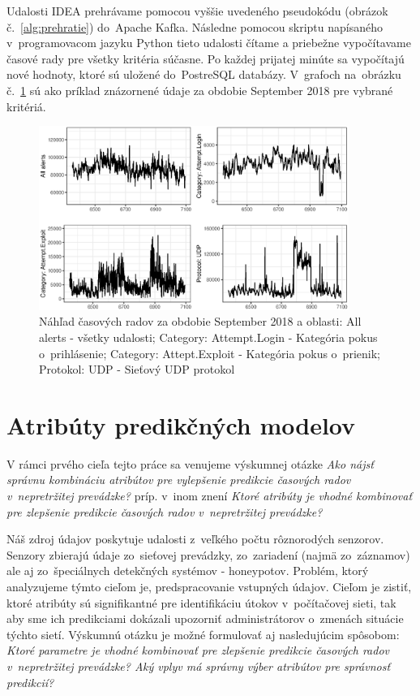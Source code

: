 \documentclass[thesismargins, thesislinespacing, openright, upjsfrontpage]{rnthesis}
\begin{document}
Udalosti IDEA prehrávame pomocou vyššie uvedeného pseudokódu (obrázok č.~\ref{alg:prehratie}) do~Apache Kafka. Následne pomocou skriptu napísaného v~programovacom jazyku Python tieto udalosti čítame a priebežne vypočítavame časové rady pre všetky kritéria súčasne. Po každej prijatej minúte sa vypočítajú nové hodnoty, ktoré sú uložené do~PostreSQL databázy. V~grafoch na~obrázku č.~\ref{fig:timeseries_example} sú ako príklad znázornené údaje za obdobie September 2018 pre vybrané kritériá.

\begin{figure}[h]
  \centering
  \includegraphics[width=0.9\textwidth]{images/TestFig3.eps}
  \caption{Náhľad časových radov za obdobie September 2018 a oblasti: All alerts - všetky udalosti; Category: Attempt.Login - Kategória pokus o~prihlásenie; Category: Attept.Exploit - Kategória pokus o~prienik; Protokol: UDP - Sieťový UDP protokol}
  \label{fig:timeseries_example}
\end{figure}

\section{Atribúty predikčných modelov}
V rámci prvého cieľa tejto práce sa venujeme výskumnej otázke \textit{Ako nájsť správnu kombináciu atribútov pre vylepšenie predikcie časových radov v~nepretržitej prevádzke?} príp. v~inom znení \textit{Ktoré atribúty je vhodné kombinovať pre zlepšenie predikcie časových radov v~nepretržitej prevádzke?}

Náš zdroj údajov poskytuje udalosti z~veľkého počtu rôznorodých senzorov. Senzory zbierajú údaje zo~sieťovej prevádzky, zo~zariadení (najmä zo~záznamov) ale aj zo~špeciálnych detekčných systémov - honeypotov. Problém, ktorý analyzujeme týmto cieľom je, predspracovanie vstupných údajov. Cieľom je zistiť, ktoré atribúty sú signifikantné pre identifikáciu útokov v~počítačovej sieti, tak aby sme ich predikciami dokázali upozorniť administrátorov o~zmenách situácie týchto sietí. Výskumnú otázku je možné formulovať aj nasledujúcim spôsobom: \textit{Ktoré parametre je vhodné kombinovať pre zlepšenie predikcie časových radov v~nepretržitej prevádzke? Aký vplyv má správny výber atribútov pre správnosť predikcií?}
\end{document}
